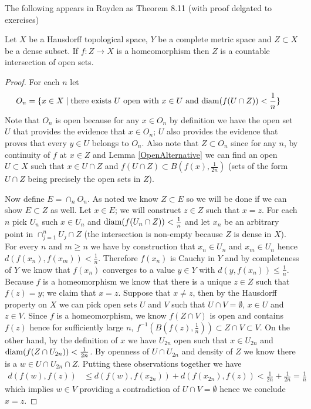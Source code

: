 The following appears in Royden as Theorem 8.11 (with proof delgated
to exercises)
\begin{lem}Let $X$ be a Hausdorff topological space, $Y$ be a
  complete metric space and $Z \subset X$ be a dense subset.  If $f :
  Z \to X$ is a homeomorphism then $Z$ is a countable intersection of
  open sets.
\end{lem}
\begin{proof}
For each $n$ let 
\begin{align*}
O_n &= \lbrace x \in X \mid \text{there exists $U$
  open with $x \in U$ and $\operatorname*{diam}(f(U \cap Z)) < \frac{1}{n}$} \rbrace
\end{align*}
Note that $O_n$ is open because for any $x \in O_n$ by definition we
have the open set $U$ that provides the evidence that $x \in O_n$;
$U$ also provides the evidence that proves that every $y \in U$
belongs to $O_n$.  Also
note that $Z \subset O_n$ since for any $n$, by continuity of $f$ at $x \in Z$ and Lemma
\ref{OpenAlternative}  we
can find an open $U \subset X$ such that $x \in U \cap Z$ and $f(U \cap Z) \subset B(f(x),
\frac{1}{2n})$ (sets of the form $U \cap Z$ being precisely the open
sets in $Z$).

Now define $E = \cap_n O_n$.  As noted we know $Z \subset E$ so we
will be done if we can show $E
\subset Z$ as well.  Let $x \in E$; we will construct $z \in Z$
such that $x = z$.  For each $n$ pick $U_n$ such $x \in U_n$ and $\operatorname*{diam}(f(U_n \cap Z)) <
\frac{1}{n}$ and let $x_n$ be an arbitrary point in $\cap_{j=1}^n
U_j \cap Z$ (the intersection is non-empty because $Z$ is dense in
$X$).  
For every $n$ and $m \geq n$ we have by construction that $x_n
\in U_n$ and $x_m \in U_n$ hence $d(f(x_n), f(x_m)) < \frac{1}{n}$.
Therefore $f(x_n)$ is Cauchy in
$Y$ and by completeness of $Y$ we know that $f(x_n)$ converges to a
value $y \in Y$ with $d(y, f(x_n)) \leq \frac{1}{n}$.  
Because $f$ is a homeomorphism we know that 
there is a unique $z \in Z$ such that $f(z) = y$; we claim that $x =
z$.  Suppose that $x
\neq z$, then by the Hausdorff property on $X$ we can pick open sets $U$ and
$V$ such that $U \cap V = \emptyset$, $x \in U$ and $z \in V$.  Since
$f$ is a homeomorphism, we know $f(Z \cap V)$ is open and contains
$f(z)$ hence for sufficiently large $n$, $f^{-1}(B(f(z), \frac{1}{n}))
\subset Z \cap V \subset V$.  On
the other hand, by the definition of $x$ we have $U_{2n}$ open such that
$x \in U_{2n}$ and $\operatorname*{diam}(f(Z \cap U_{2n})) < \frac{1}{2n}$.  By openness of
$U \cap U_{2n}$ and density of $Z$ we know there is a $w \in U \cap
U_{2n} \cap Z$.  Putting these observations together we have
\begin{align*}
d(f(w), f(z)) &\leq  d(f(w), f(x_{2n})) + d(f(x_{2n}), f(z)) 
< \frac{1}{2n} + \frac{1}{2n} = \frac{1}{n}
\end{align*}
which implies $w \in V$ providing a contradiction of $U \cap V =
\emptyset$ hence we conclude $x = z$.
\end{proof}

